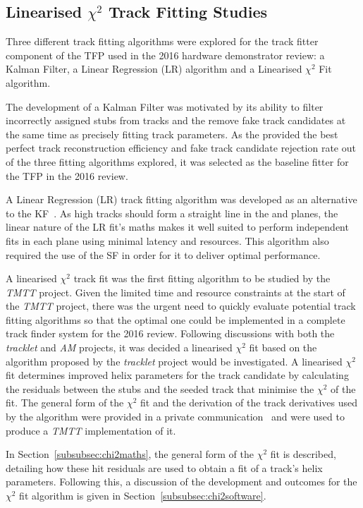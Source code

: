 \subsection{Linearised $\chi^{2}$ Track Fitting Studies}\label{subsec:chi2}
Three different track fitting algorithms were explored for the track fitter component of the TFP used in the 2016 hardware demonstrator review: a Kalman Filter, a Linear Regression (LR) algorithm and a Linearised $\chi^{2}$ Fit algorithm.

The development of a Kalman Filter was motivated by its ability to filter incorrectly assigned stubs from tracks and the remove fake track candidates at the same time as precisely fitting track parameters.
As the \KF provided the best perfect track reconstruction efficiency and fake track candidate rejection rate out of the three fitting algorithms explored, it was selected as the baseline fitter for the TFP in the 2016 review.

A Linear Regression (LR) track fitting algorithm was developed as an alternative to the KF~\cite{TMTT_FLP}.
As high \pT tracks should form a straight line in the \emph{\rphi} and \emph{\rz} planes, the linear nature of the LR fit's maths makes it well suited to perform independent fits in each plane using minimal latency and resources.
This algorithm also required the use of the SF in order for it to deliver optimal performance.

A linearised $\chi^{2}$ track fit was the first fitting algorithm to be studied by the \emph{TMTT} project.
Given the limited time and resource constraints at the start of the \emph{TMTT} project, there was the urgent need to quickly evaluate potential track fitting algorithms so that the optimal one could be implemented in a complete track finder system for the 2016 review.
Following discussions with both the \emph{tracklet} and \emph{AM} projects, it was decided a linearised $\chi^{2}$ fit based on the algorithm proposed by the \emph{tracklet} project would be investigated.
A linearised $\chi^{2}$ fit determines improved helix parameters for the track candidate by calculating the residuals between the stubs and the seeded track that minimise the $\chi^{2}$ of the fit.
The general form of the $\chi^{2}$ fit and the derivation of the track derivatives used by the algorithm were provided in a private communication~\cite{CMS_DN-14-043} and were used to produce a \emph{TMTT} implementation of it.


In Section~\ref{subsubsec:chi2maths}, the general form of the $\chi^{2}$ fit is described, detailing how these hit residuals are used to obtain a fit of a track's helix parameters.
Following this, a discussion of the development and outcomes for the $\chi^{2}$ fit algorithm is given in Section~\ref{subsubsec:chi2software}.

